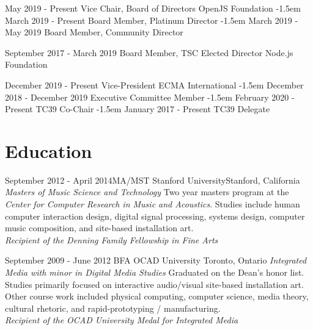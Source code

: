 \documentclass[10pt,a4paper,sans]{moderncv}   %
\begin{document}
\cventry
  {May 2019 - Present}
  {Vice Chair, Board of Directors}
  {OpenJS Foundation}
  {}{}{}
\kern-1.5em
\cventry
  {March 2019 - Present}
  {Board Member, Platinum Director}
  {}
  {}{}{}
\kern-1.5em
\cventry
  {March 2019 - May 2019}
  {Board Member, Community Director}
  {}
  {}{}{}

\cventry
  {September 2017 - March 2019}
  {Board Member, TSC Elected Director}
  {Node.js Foundation}
  {}{}{}

\cventry
  {December 2019 - Present}
  {Vice-President}
  {ECMA International}
  {}{}{}
\kern-1.5em
\cventry
  {December 2018 - December 2019}
  {Executive Committee Member}
  {}
  {}{}{}
\kern-1.5em
\cventry
  {February 2020 - Present}
  {TC39 Co-Chair}
  {}
  {}{}{}
\kern-1.5em
\cventry
  {January 2017 - Present}
  {TC39 Delegate}
  {}
  {}{}{}

\section{Education}

\cventry
  {September 2012 - April 2014}{MA/MST}
  {Stanford University}{Stanford, California}
  {\textit{Masters of Music Science and Technology}}
  {Two year masters program at the \textit{Center for Computer Research in Music and Acoustics}.  Studies include human computer interaction design, digital signal processing, systems design, computer music composition, and site-based installation art. \\\textit{Recipient of the Denning Family Fellowship in Fine Arts }}

\cventry
  {September 2009 - June 2012}
  {BFA}
  {OCAD University}
  {Toronto, Ontario}
  {\textit{Integrated Media with minor in Digital Media Studies}}
  {Graduated on the Dean's honor list. Studies primarily focused on interactive audio/visual site-based installation art.  Other course work included physical computing, computer science, media theory, cultural rhetoric, and rapid-prototyping / manufacturing. \\\textit{Recipient of the OCAD University Medal for Integrated Media }}
\end{document}
